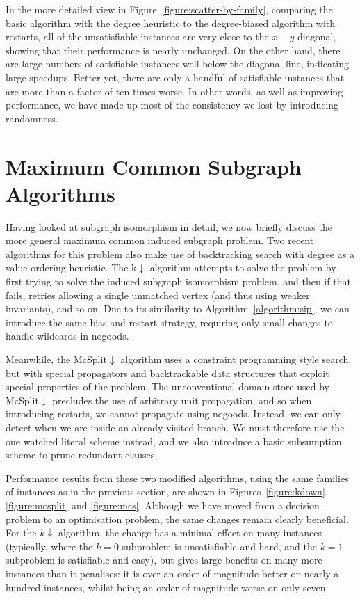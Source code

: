\documentclass[a4paper,UKenglish]{lipics-v2018}
\newcommand{\figureref}[1]{Figure~\ref{#1}}
\newcommand{\threefigureref}[3]{Figures~\ref{#1}, \ref{#2} and \ref{#3}}
\newcommand{\algorithmref}[1]{Algorithm~\ref{#1}}
\begin{document}
In the more detailed view in \figureref{figure:scatter-by-family}, comparing the basic algorithm with the
degree heuristic to the degree-biased algorithm with restarts, all of the unsatisfiable instances
are very close to the $x-y$ diagonal, showing that their performance is nearly unchanged. On the
other hand, there are large numbers of satisfiable instances well below the diagonal line,
indicating large speedups.  Better yet, there are only a handful of satisfiable instances that are
more than a factor of ten times worse. In other words, as well as improving performance, we have
made up most of the consistency we lost by introducing randomness.

\section{Maximum Common Subgraph Algorithms}

Having looked at subgraph isomorphism in detail, we now briefly discuss the more general maximum
common induced subgraph problem.  Two recent algorithms for this problem also make use of
backtracking search with degree as a value-ordering heuristic. The k${\downarrow}$ algorithm
\cite{DBLP:conf/aaai/HoffmannMR17} attempts to solve the problem by first trying to solve the
induced subgraph isomorphism problem, and then if that fails, retries allowing a single unmatched
vertex (and thus using weaker invariants), and so on. Due to its similarity to \algorithmref{algorithm:sip},
we can introduce the same bias and restart strategy, requiring only small changes
to handle wildcards in nogoods.

Meanwhile, the McSplit${\downarrow}$ algorithm
\cite{DBLP:conf/ijcai/McCreeshPT17} uses a constraint programming style search, but with special
propagators and backtrackable data structures that exploit special properties of the problem. The
unconventional domain store used by McSplit${\downarrow}$ precludes the use of arbitrary unit
propagation, and so when introducing restarts, we cannot propagate using nogoods.  Instead, we can
only detect when we are inside an already-visited branch.  We must therefore use the one watched
literal scheme instead, and we also introduce a basic subsumption scheme to prune redundant clauses.

Performance results from these two modified algorithms, using the same families of instances as in
the previous section, are shown in \threefigureref{figure:kdown}{figure:mcsplit}{figure:mcs}. Although we have
moved from a decision problem to an optimisation problem, the same changes remain clearly
beneficial. For the $k{\downarrow}$ algorithm, the change has a minimal effect on many instances
(typically, where the $k = 0$ subproblem is unsatisfiable and hard, and the $k = 1$ subproblem is
satisfiable and easy), but gives large benefits on many more instances than it penalises: it is over
an order of magnitude better on nearly a hundred instances, whilst being an order of magnitude worse
on only seven.
\end{document}
